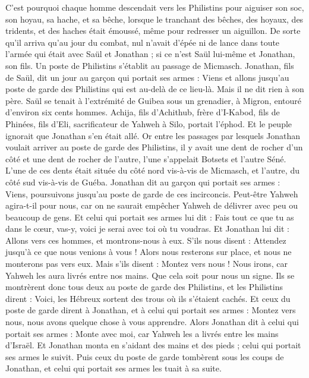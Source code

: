 \begin{multicols}{2}
C'est pourquoi chaque homme descendait vers les Philistins pour aiguiser son soc, son hoyau, sa hache, et sa bêche,
lorsque le tranchant des bêches, des hoyaux, des tridents, et des haches était émoussé, même pour redresser un aiguillon.
De sorte qu'il arriva qu'au jour du combat, nul n'avait d'épée ni de lance dans toute l'armée qui était avec Saül et Jonathan ; si ce n'est Saül lui-même et Jonathan, son fils.
Un poste de Philistins s'établit au passage de Micmasch.
\VerseOne{}Jonathan, fils de Saül, dit un jour au garçon qui portait ses armes : Viens et allons jusqu'au poste de garde des Philistins qui est au-delà de ce lieu-là. Mais il ne dit rien à son père.
Saül se tenait à l'extrémité de Guibea sous un grenadier, à Migron, entouré d'environ six cents hommes.
Achija, fils d'Achithub, frère d'I-Kabod, fils de Phinées, fils d'Eli, sacrificateur de Yahweh à Silo, portait l'éphod. Et le peuple ignorait que Jonathan s'en était allé.
Or entre les passages par lesquels Jonathan voulait arriver au poste de garde des Philistins, il y avait une dent de rocher d'un côté et une dent de rocher de l'autre, l'une s'appelait Botsets et l'autre Séné.
L'une de ces dents était située du côté nord vis-à-vis de Micmasch, et l'autre, du côté sud vis-à-vis de Guéba.
Jonathan dit au garçon qui portait ses armes : Viens, poursuivons jusqu'au poste de garde de ces incirconcis. Peut-être Yahweh agira-t-il pour nous, car on ne saurait empêcher Yahweh de délivrer avec peu ou beaucoup de gens.
Et celui qui portait ses armes lui dit : Fais tout ce que tu as dans le cœur, vas-y, voici je serai avec toi où tu voudras.
Et Jonathan lui dit : Allons vers ces hommes, et montrons-nous à eux.
S'ils nous disent : Attendez jusqu'à ce que nous venions à vous ! Alors nous resterons sur place, et nous ne monterons pas vers eux.
Mais s'ils disent : Montez vers nous ! Nous irons, car Yahweh les aura livrés entre nos mains. Que cela soit pour nous un signe.
Ils se montrèrent donc tous deux au poste de garde des Philistins, et les Philistins dirent : Voici, les Hébreux sortent des trous où ils s'étaient cachés.
Et ceux du poste de garde dirent à Jonathan, et à celui qui portait ses armes : Montez vers nous, nous avons quelque chose à vous apprendre. Alors Jonathan dit à celui qui portait ses armes : Monte avec moi, car Yahweh les a livrés entre les mains d'Israël.
Et Jonathan monta en s'aidant des mains et des pieds ; celui qui portait ses armes le suivit. Puis ceux du poste de garde tombèrent sous les coups de Jonathan, et celui qui portait ses armes les tuait à sa suite.

\end{multicols}
